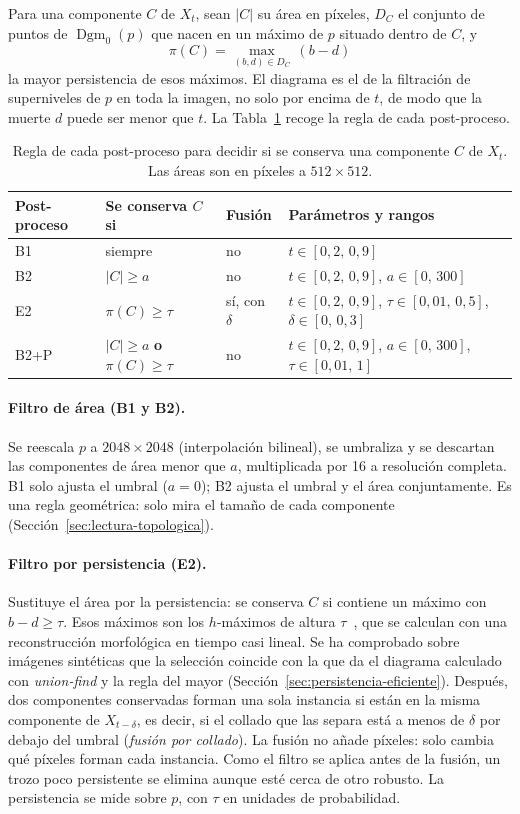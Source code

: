 Para una componente $C$ de $X_t$, sean $|C|$ su área en píxeles,
$D_C$ el conjunto de puntos de $\operatorname{Dgm}_0(p)$ que nacen en
un máximo de $p$ situado dentro de $C$, y
\[
  \pi(C)=\max_{(b,d)\in D_C}\,(b-d)
\]
la mayor persistencia de esos máximos. El diagrama es el de
la filtración de superniveles de $p$ en toda la imagen, no solo por
encima de $t$, de modo que la muerte $d$ puede ser menor que $t$. La
Tabla~\ref{tab:postprocesos} recoge la regla de cada post-proceso.

\begin{table}[ht]
\centering
\small
\begin{tabular}{@{}llll@{}}
\toprule
Post-proceso & Se conserva $C$ si & Fusión & Parámetros y rangos\\
\midrule
B1 & siempre & no & $t\in[0{,}2,\,0{,}9]$\\
B2 & $|C|\ge a$ & no & $t\in[0{,}2,\,0{,}9]$, $a\in[0,\,300]$\\
E2 & $\pi(C)\ge\tau$ & sí, con $\delta$ & $t\in[0{,}2,\,0{,}9]$, $\tau\in[0{,}01,\,0{,}5]$, $\delta\in[0,\,0{,}3]$\\
B2+P & $|C|\ge a$ \textbf{o} $\pi(C)\ge\tau$ & no & $t\in[0{,}2,\,0{,}9]$, $a\in[0,\,300]$, $\tau\in[0{,}01,\,1]$\\
\bottomrule
\end{tabular}
\caption{Regla de cada post-proceso para decidir si se conserva una
componente $C$ de $X_t$. Las áreas son en píxeles a $512\times512$.}
\label{tab:postprocesos}
\end{table}

\paragraph{Filtro de área (B1 y B2).} Se reescala $p$ a
$2048\times2048$ (interpolación bilineal), se umbraliza y se descartan
las componentes de área menor que $a$, multiplicada por 16 a resolución
completa. B1 solo ajusta el umbral ($a=0$); B2 ajusta el umbral y el
área conjuntamente. Es una regla geométrica: solo mira el tamaño de cada
componente (Sección~\ref{sec:lectura-topologica}).

\paragraph{Filtro por persistencia (E2).} Sustituye el área por la
persistencia: se conserva $C$ si contiene un máximo con $b-d\ge\tau$.
Esos máximos son los $h$-máximos de altura $\tau$~\cite{soille2003}, que
se calculan con una reconstrucción morfológica en tiempo casi lineal.
Se ha comprobado sobre imágenes sintéticas que la selección coincide con
la que da el diagrama calculado con \emph{union-find} y la regla del
mayor (Sección~\ref{sec:persistencia-eficiente}). Después, dos
componentes conservadas forman una sola instancia si están en la misma
componente de $X_{t-\delta}$, es decir, si el collado que las separa
está a menos de $\delta$ por debajo del umbral (\emph{fusión por
collado}). La fusión no añade píxeles: solo cambia qué píxeles forman
cada instancia. Como el filtro se aplica antes de la fusión, un trozo
poco persistente se elimina aunque esté cerca de otro robusto. La
persistencia se mide sobre $p$, con $\tau$ en unidades de probabilidad.

